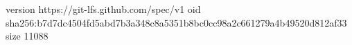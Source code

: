 version https://git-lfs.github.com/spec/v1
oid sha256:b7d7dc4504fd5abd7b3a348c8a5351b8bc0cc98a2c661279a4b49520d812af33
size 11088
